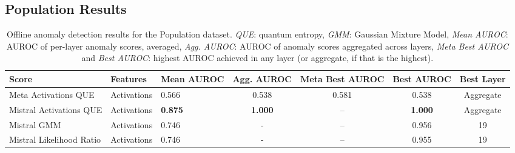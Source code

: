 



\subsection{Population Results}



\begin{table}[H]
\centering
\scriptsize
\renewcommand{\arraystretch}{1.2}
\setlength{\tabcolsep}{2pt}
\begin{tabular}{lp{3cm}lcccc}
\toprule
\textbf{Score} & \textbf{Features} & \textbf{Mean AUROC} & \textbf{Agg. AUROC} & \textbf{Meta Best AUROC} & \textbf{Best AUROC} & \textbf{Best Layer} \\
\midrule
Meta Activations QUE             & Activations & 0.566  & 0.538  & 0.581  & 0.538  & Aggregate \\ 
Mistral Activations QUE          & Activations & \textbf{0.875}  & \textbf{1.000}  & --     & \textbf{1.000}  & Aggregate \\ 
Mistral GMM & Activations & 0.746  & -      & --     & 0.956  & 19 \\ 
Mistral Likelihood Ratio         & Activations & 0.746  & -      & --     & 0.955  & 19 \\ 
\bottomrule
\end{tabular}
\caption{Offline anomaly detection results for the Population dataset. \emph{QUE}: quantum entropy, \emph{GMM}: Gaussian Mixture Model, \emph{Mean AUROC}: AUROC of per-layer anomaly scores, averaged, \emph{Agg. AUROC}: AUROC of anomaly scores aggregated across layers, \emph{Meta Best AUROC} and \emph{Best AUROC}: highest AUROC achieved in any layer (or aggregate, if that is the highest).}
\label{tab:offline_anomaly_population}
\end{table}

